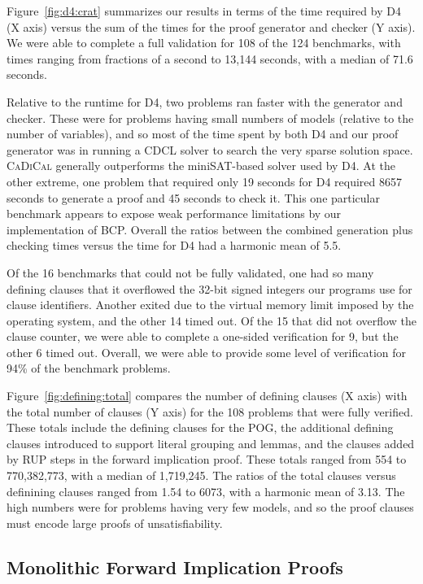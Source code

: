 \documentclass[letterpaper,USenglish,cleveref, autoref, thm-restate]{lipics-v2021}
\newcommand{\progname}[1]{\textsc{#1}}
\newcommand{\dfour}{\progname{D4}}
\newcommand{\cadical}{\progname{CaDiCal}}
\begin{document}
Figure~\ref{fig:d4:crat} summarizes our results in terms of the time
required by \dfour{} (X axis) versus the sum of the times for the
proof generator and checker (Y axis).
We were able to complete a full validation for 108 of the 124
benchmarks, with times ranging from fractions of a second to 13,144
seconds, with a median of 71.6 seconds.

Relative to the runtime for \dfour{}, two problems ran faster with the
generator and checker.  These were for problems having small numbers
of models (relative to the number of variables), and so most of the
time spent by both \dfour{} and our proof generator was in running a
CDCL solver to search the very sparse solution space.  \cadical{}
generally outperforms the miniSAT-based solver used by \dfour{}.  At
the other extreme, one problem that required only 19 seconds for
\dfour{} required 8657 seconds to generate a proof and 45 seconds to
check it.  This one particular benchmark appears to expose weak performance
limitations by our implementation of BCP\@.  Overall the ratios
between the combined generation plus checking times versus the time
for \dfour{} had a harmonic mean of 5.5.

Of the 16 benchmarks that could not be fully validated, one had so
many defining clauses that it overflowed the 32-bit signed integers
our programs use for clause identifiers.  Another exited due to the
virtual memory limit imposed by the operating system, and the other 14
timed out.  Of the 15 that did not overflow the clause counter, we
were able to complete a one-sided verification for 9, but the other 6
timed out.  Overall, we were able to provide some level of
verification for 94\% of the benchmark problems.



Figure~\ref{fig:defining:total} compares the number of defining
clauses (X axis) with the total number of clauses (Y axis) for the 108
problems that were fully verified.  These totals include the defining
clauses for the POG, the additional defining clauses introduced to
support literal grouping and lemmas, and the clauses added by RUP
steps in the forward implication proof.  These totals ranged from 554
to 770,382,773, with a median of 1,719,245.  The ratios of the total
clauses versus definining clauses ranged from 1.54 to 6073, with a
harmonic mean of 3.13.  The high numbers were for problems having very
few models, and so the proof clauses must encode large proofs of
unsatisfiability.

\subsection{Monolithic Forward Implication Proofs}
\label{app:experiment:monolithic}
\end{document}
